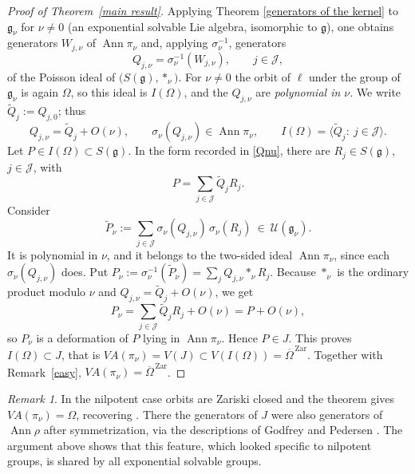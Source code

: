 \documentclass[11pt]{amsart}
\theoremstyle{plain}
\theoremstyle{definition}
\theoremstyle{remark}
\newtheorem{rmk}[thm]{Remark}
\newcommand{\g}{\mathfrak g}
\newcommand{\Ann}{\operatorname{Ann}}
\newcommand{\VA}{V\!A}
\newcommand{\wt}{\widetilde}
\newcommand{\clos}[1]{\overline{#1}^{\,\mathrm{Zar}}}
\begin{document}
	\begin{proof}[Proof of Theorem~\ref{main result}]
		
		
		Applying  Theorem \ref{generators of the kernel} to $\g_\nu$ for $\nu\neq0$ (an exponential solvable Lie algebra, isomorphic to $\g$), one obtains generators $W_{j,\nu}$ of $\Ann\pi_\nu$ and, applying $\sigma_\nu^{-1}$, generators
		\[
		Q_{j,\nu}=\sigma_\nu^{-1}(W_{j,\nu}),\qquad j\in\mathcal J,
		\]
		of the Poisson ideal of $\big(S(\g),*_\nu\big)$. For $\nu\ne0$ the orbit of $\ell$ under the group of $\g_\nu$ is again $\Omega$, so this ideal is $I(\Omega)$, and the $Q_{j,\nu}$ are \emph{polynomial in $\nu$}. We write ${\widetilde Q_j}:=Q_{j,0}$; thus
		\begin{equation}\label{Qnu}
			Q_{j,\nu}={\widetilde Q_j}+O(\nu),\qquad \sigma_\nu(Q_{j,\nu})\in\Ann\pi_\nu,\qquad I(\Omega)=\big\langle {\widetilde Q_j}:\ j\in\mathcal J\big\rangle.
		\end{equation}
		Let $P\in I(\Omega)\subset S(\g)$. In the form recorded in \eqref{Qnu}, there are $R_j\in S(\g)$, $j\in\mathcal J$, with
		\[
		P=\sum_{j\in\mathcal J}{\widetilde Q_j}R_j .
		\]
		Consider
		\[
		\wt P_\nu:=\sum_{j\in\mathcal J}\sigma_\nu(Q_{j,\nu})\,\sigma_\nu(R_j)\ \in\ \mathcal U(\g_\nu).
		\]
		It is polynomial in $\nu$, and it belongs to the two-sided ideal $\Ann\pi_\nu$, since each $\sigma_\nu(Q_{j,\nu})$ does. Put $P_\nu:=\sigma_\nu^{-1}(\wt P_\nu)=\sum_jQ_{j,\nu}*_\nu R_j$. Because $*_\nu$ is the ordinary product modulo $\nu$ and $Q_{j,\nu}={\widetilde Q_j}+O(\nu)$, we get
		\[
		P_\nu=\sum_{j\in\mathcal J}{\widetilde Q_j}R_j+O(\nu)=P+O(\nu),
		\]
		so $P_\nu$ is a deformation of $P$ lying in $\Ann\pi_\nu$. Hence $P\in J$. This proves $I(\Omega)\subset J$, that is $\VA(\pi_\nu)=V(J)\subset V(I(\Omega))=\clos\Omega$. Together with Remark~\ref{easy}, $\VA(\pi_\nu)=\clos\Omega$.
	\end{proof}
	
	\begin{rmk}
		In the nilpotent case orbits are Zariski closed and the theorem gives $\VA(\pi_\nu)=\Omega$, recovering \cite[Th\'eor\`eme~5.4.1]{BDM05}. There the generators of $J$ were also generators of $\Ann\rho$ after symmetrization, via the descriptions of Godfrey and Pedersen \cite{Go,Pe84}. The argument above shows that this feature, which looked specific to nilpotent groups, is shared by all exponential solvable groups.
	\end{rmk}
	
\end{document}
